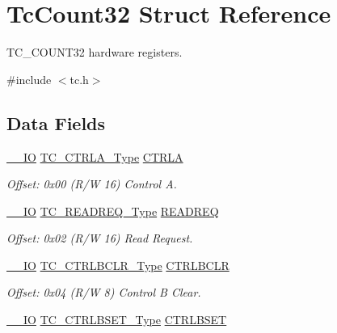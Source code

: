 \hypertarget{struct_tc_count32}{}\section{Tc\+Count32 Struct Reference}
\label{struct_tc_count32}


T\+C\+\_\+\+C\+O\+U\+N\+T32 hardware registers.  




{\ttfamily \#include $<$tc.\+h$>$}

\subsection*{Data Fields}
\begin{DoxyCompactItemize}
\item 
\mbox{\hyperlink{core__cm0plus_8h_aec43007d9998a0a0e01faede4133d6be}{\+\_\+\+\_\+\+IO}} \mbox{\hyperlink{union_t_c___c_t_r_l_a___type}{T\+C\+\_\+\+C\+T\+R\+L\+A\+\_\+\+Type}} \mbox{\hyperlink{struct_tc_count32_a282ae6be6071506774ed492a00c9a7c5}{C\+T\+R\+LA}}
\begin{DoxyCompactList}\small\item\em Offset\+: 0x00 (R/W 16) Control A. \end{DoxyCompactList}\item 
\mbox{\hyperlink{core__cm0plus_8h_aec43007d9998a0a0e01faede4133d6be}{\+\_\+\+\_\+\+IO}} \mbox{\hyperlink{union_t_c___r_e_a_d_r_e_q___type}{T\+C\+\_\+\+R\+E\+A\+D\+R\+E\+Q\+\_\+\+Type}} \mbox{\hyperlink{struct_tc_count32_a9cb0a3ec797bc9e4a1b1db94d2865b34}{R\+E\+A\+D\+R\+EQ}}
\begin{DoxyCompactList}\small\item\em Offset\+: 0x02 (R/W 16) Read Request. \end{DoxyCompactList}\item 
\mbox{\hyperlink{core__cm0plus_8h_aec43007d9998a0a0e01faede4133d6be}{\+\_\+\+\_\+\+IO}} \mbox{\hyperlink{union_t_c___c_t_r_l_b_c_l_r___type}{T\+C\+\_\+\+C\+T\+R\+L\+B\+C\+L\+R\+\_\+\+Type}} \mbox{\hyperlink{struct_tc_count32_a5d266ecd4b84c85e2136fcdfcdd1e57f}{C\+T\+R\+L\+B\+C\+LR}}
\begin{DoxyCompactList}\small\item\em Offset\+: 0x04 (R/W 8) Control B Clear. \end{DoxyCompactList}\item 
\mbox{\hyperlink{core__cm0plus_8h_aec43007d9998a0a0e01faede4133d6be}{\+\_\+\+\_\+\+IO}} \mbox{\hyperlink{union_t_c___c_t_r_l_b_s_e_t___type}{T\+C\+\_\+\+C\+T\+R\+L\+B\+S\+E\+T\+\_\+\+Type}} \mbox{\hyperlink{struct_tc_count32_aad77cd2b986ac4f6e8112f1d8ef850a5}{C\+T\+R\+L\+B\+S\+ET}}

\end{DoxyCompactItemize}
